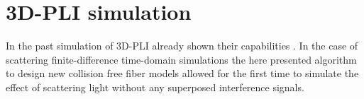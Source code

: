 \setcounter{chapter}{4}
\chapter{\acs{3D-PLI} simulation}
\label{cha:sof:simulation}
% 
% 
% 
% 
% 
In the past simulation of \ac{3D-PLI} already shown their capabilities \cite{Dohmen2015,Menzel2015,Menzel2016,Menzel2020,Menzel2021,MenzelMaster,MenzelDissertation}.
In the case of scattering finite-difference time-domain simulations the here presented algorithm to design new collision free fiber models allowed for the first time to simulate the effect of scattering light without any superposed interference signals.
